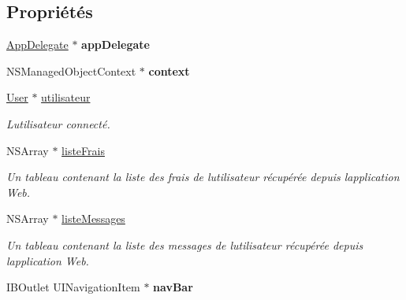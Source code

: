 \subsection*{Propriétés}
\begin{DoxyCompactItemize}
\item 
\hypertarget{interface_notification_table_view_controller_a67a4012963d88d1454334e4e8a726254}{}\hyperlink{interface_app_delegate}{App\+Delegate} $\ast$ {\bfseries app\+Delegate}\label{interface_notification_table_view_controller_a67a4012963d88d1454334e4e8a726254}

\item 
\hypertarget{interface_notification_table_view_controller_a9c9f4c5c0b953c8b9e32bd64a75522b2}{}N\+S\+Managed\+Object\+Context $\ast$ {\bfseries context}\label{interface_notification_table_view_controller_a9c9f4c5c0b953c8b9e32bd64a75522b2}

\item 
\hypertarget{interface_notification_table_view_controller_a8f67d19583a689e2ca4c84d7ca572c39}{}\hyperlink{interface_user}{User} $\ast$ \hyperlink{interface_notification_table_view_controller_a8f67d19583a689e2ca4c84d7ca572c39}{utilisateur}\label{interface_notification_table_view_controller_a8f67d19583a689e2ca4c84d7ca572c39}

\begin{DoxyCompactList}\small\item\em L\textquotesingle{}utilisateur connecté. \end{DoxyCompactList}\item 
\hypertarget{interface_notification_table_view_controller_a74bafc4690ddce9249a6864098e19ea9}{}N\+S\+Array $\ast$ \hyperlink{interface_notification_table_view_controller_a74bafc4690ddce9249a6864098e19ea9}{liste\+Frais}\label{interface_notification_table_view_controller_a74bafc4690ddce9249a6864098e19ea9}

\begin{DoxyCompactList}\small\item\em Un tableau contenant la liste des frais de l\textquotesingle{}utilisateur récupérée depuis l\textquotesingle{}application Web. \end{DoxyCompactList}\item 
\hypertarget{interface_notification_table_view_controller_aa2b9e78e7abf1b4c437848996594bf33}{}N\+S\+Array $\ast$ \hyperlink{interface_notification_table_view_controller_aa2b9e78e7abf1b4c437848996594bf33}{liste\+Messages}\label{interface_notification_table_view_controller_aa2b9e78e7abf1b4c437848996594bf33}

\begin{DoxyCompactList}\small\item\em Un tableau contenant la liste des messages de l\textquotesingle{}utilisateur récupérée depuis l\textquotesingle{}application Web. \end{DoxyCompactList}\item 
\hypertarget{interface_notification_table_view_controller_a78c56fb69a15ffeeb56268978aa06b19}{}I\+B\+Outlet U\+I\+Navigation\+Item $\ast$ {\bfseries nav\+Bar}\label{interface_notification_table_view_controller_a78c56fb69a15ffeeb56268978aa06b19}

\end{DoxyCompactItemize}
